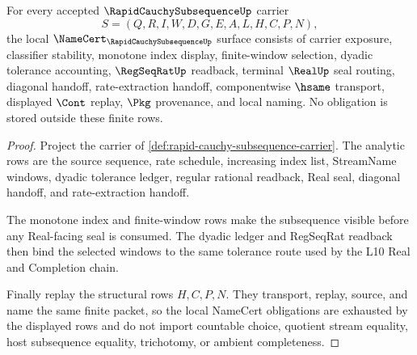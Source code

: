 \begin{theorem}
\label{thm:rapid-cauchy-subsequence-namecert-obligations}
For every accepted $\RapidCauchySubsequenceUp$ carrier
$$
S=(Q,R,I,W,D,G,E,A,L,H,C,P,N),
$$
the local $\NameCert_{\RapidCauchySubsequenceUp}$ surface consists of carrier exposure, classifier stability, monotone index display, finite-window selection, dyadic tolerance accounting, $\RegSeqRatUp$ readback, terminal $\RealUp$ seal routing, diagonal handoff, rate-extraction handoff, componentwise $\hsame$ transport, displayed $\Cont$ replay, $\Pkg$ provenance, and local naming. No obligation is stored outside these finite rows.
\end{theorem}
\begin{proof}
Project the carrier of \autoref{def:rapid-cauchy-subsequence-carrier}. The analytic rows are the source sequence, rate schedule, increasing index list, StreamName windows, dyadic tolerance ledger, regular rational readback, Real seal, diagonal handoff, and rate-extraction handoff.

The monotone index and finite-window rows make the subsequence visible before any Real-facing seal is consumed. The dyadic ledger and RegSeqRat readback then bind the selected windows to the same tolerance route used by the L10 Real and Completion chain.

Finally replay the structural rows $H,C,P,N$. They transport, replay, source, and name the same finite packet, so the local NameCert obligations are exhausted by the displayed rows and do not import countable choice, quotient stream equality, host subsequence equality, trichotomy, or ambient completeness.
\end{proof}

